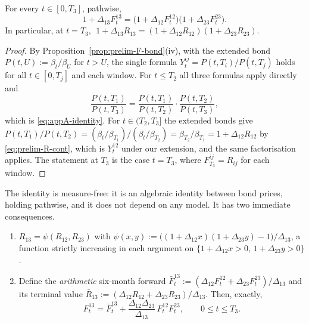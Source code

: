 \documentclass[../../main.tex]{subfiles}
\begin{document}
\begin{proposition}\label{prop:appA-identity}
For every $t\in[0,T_3]$, pathwise,
\begin{equation}\label{eq:appA-identity}
1+\Delta_{13}F^{13}_t=\big(1+\Delta_{12}F^{12}_t\big)\big(1+\Delta_{23}F^{23}_t\big).
\end{equation}
In particular, at $t=T_3$, $\;1+\Delta_{13}R_{13}=(1+\Delta_{12}R_{12})(1+\Delta_{23}R_{23})$.
\end{proposition}

\begin{proof}
By Proposition~\ref{prop:prelim-F-bond}(iv), with the extended bond $P(t,U):=\beta_t/\beta_U$ for $t>U$, the single formula $Y^{ij}_t=P(t,T_i)/P(t,T_j)$ holds for all $t\in[0,T_j]$ and each window. For $t\le T_2$ all three formulas apply directly and
\[
\frac{P(t,T_1)}{P(t,T_3)}=\frac{P(t,T_1)}{P(t,T_2)}\cdot\frac{P(t,T_2)}{P(t,T_3)},
\]
which is \eqref{eq:appA-identity}. For $t\in(T_2,T_3]$ the extended bonds give $P(t,T_1)/P(t,T_2)=(\beta_t/\beta_{T_1})/(\beta_t/\beta_{T_2})=\beta_{T_2}/\beta_{T_1}=1+\Delta_{12}R_{12}$ by \eqref{eq:prelim-R-cont}, which is $Y^{12}_t$ under our extension, and the same factorisation applies. The statement at $T_3$ is the case $t=T_3$, where $F^{ij}_{T_3}=R_{ij}$ for each window.
\end{proof}

The identity is measure-free: it is an algebraic identity between bond prices, holding pathwise, and it does not depend on any model. It has two immediate consequences.

\begin{corollary}\label{cor:appA-function}
\begin{enumerate}[nosep,label=(\roman*)]
\item $R_{13}=\psi(R_{12},R_{23})$ with $\psi(x,y):=\big((1+\Delta_{12}x)(1+\Delta_{23}y)-1\big)/\Delta_{13}$, a function strictly increasing in each argument on $\{1+\Delta_{12}x>0,\,1+\Delta_{23}y>0\}$.
\item Define the \emph{arithmetic} six-month forward $\bar F^{13}_t:=(\Delta_{12}F^{12}_t+\Delta_{23}F^{23}_t)/\Delta_{13}$ and its terminal value $\bar R_{13}:=(\Delta_{12}R_{12}+\Delta_{23}R_{23})/\Delta_{13}$. Then, exactly,
\begin{equation}\label{eq:appA-product}
F^{13}_t=\bar F^{13}_t+\frac{\Delta_{12}\Delta_{23}}{\Delta_{13}}\,F^{12}_tF^{23}_t,\qquad 0\le t\le T_3 .
\end{equation}
\end{enumerate}
\end{corollary}
\end{document}
